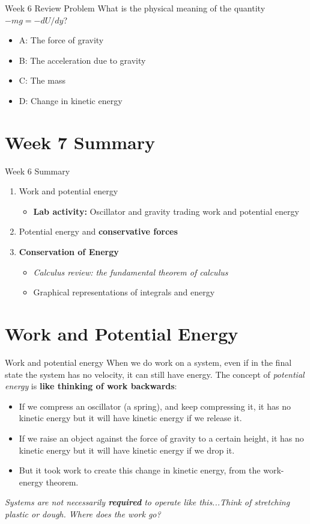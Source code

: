 \documentclass{beamer}
\begin{document}
\begin{frame}{Week 6 Review Problem}
What is the physical meaning of the quantity $-mg =-dU/dy$?
\begin{itemize}
\item A: The force of gravity 
\item B: The acceleration due to gravity
\item C: The mass
\item D: Change in kinetic energy
\end{itemize}
\end{frame}

\section{Week 7 Summary}

\begin{frame}{Week 6 Summary}
\begin{enumerate}
\item \alert{Work} and \alert{potential energy}
\begin{itemize}
\item \textbf{Lab activity:} Oscillator and gravity trading work and potential energy
\end{itemize}
\item Potential energy and \textbf{conservative forces}
\item \alert{\textbf{Conservation of Energy}}
\begin{itemize}
\item \textit{Calculus review: the fundamental theorem of calculus}
\item Graphical representations of integrals and energy
\end{itemize}
\end{enumerate}
\end{frame}

\section{Work and Potential Energy}

\begin{frame}{Work and potential energy}
When we do work on a system, even if in the final state the system has no velocity, it can still have energy.  The concept of \textit{potential energy} is \textbf{like thinking of work backwards}:
\begin{itemize}
\item If we compress an oscillator (a spring), and keep compressing it, it has no kinetic energy but it will have kinetic energy if we release it.
\item If we raise an object against the force of gravity to a certain height, it has no kinetic energy but it will have kinetic energy if we drop it.
\item \alert{But it took work to create this change in kinetic energy, from the work-energy theorem.} 
\end{itemize}
\textit{Systems are not necessarily \textbf{required} to operate like this...Think of stretching plastic or dough.  Where does the work go?}
\end{frame}
\end{document}
